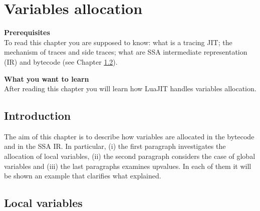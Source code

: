 \chapter{Variables allocation}

\begin{multicols}{2}
\noindent
\textbf{Prerequisites}\\
To read this chapter you are supposed to know: what is a tracing JIT; the mechanism of traces and side traces; what are SSA intermediate representation (IR) and bytecode (see Chapter \ref{}).

\columnbreak
\noindent
\textbf{What you want to learn}\\
After reading this chapter you will learn how LuaJIT handles variables allocation.
\end{multicols}

\section{Introduction}
\noindent
The aim of this chapter is to describe how variables are allocated in the bytecode and in the SSA IR. In particular, (i) the first paragraph investigates the allocation of local variables, (ii) the second paragraph considers the case of global variables and (iii) the last paragraphs examines upvalues. In each of them it will be shown an example that clarifies what explained.

\section{Local variables}

